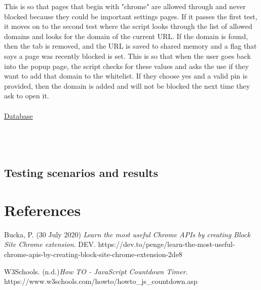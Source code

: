 \documentclass[12pt]{article}
\begin{document}
This is so that pages that begin with "chrome" are allowed through and never blocked because they could be important settings pages. 
If it passes the first test, it moves on to the second test where the script looks through the list of allowed domains and looks for the domain of the current URL. If the domain is found, then the tab is removed, and the URL is saved to shared memory and a flag that says a page was recently blocked is set. 
This is so that when the user goes back into the popup page, the script checks for these values and asks the use if they want to add that domain to the whitelist. If they choose yes and a valid pin is provided, then the domain 
is added and will not be blocked the next time they ask to open it.
\\\\
\underline{Database}\\\\


\\\\
\subsection{Testing scenarios and results}

\section{References}

\begingroup
\renewcommand{\section}[2]{}
\begin{thebibliography}{10}
    Bucka, P. (30 July 2020) \textit{Learn the most useful Chrome APIs by creating Block Site Chrome extension}. 
    DEV. https://dev.to/penge/learn-the-most-useful-chrome-apis-by-creating-block-site-chrome-extension-2de8
    
    W3Schools. (n.d.)\textit{How TO - JavaScript Countdown Timer}. https://www.w3schools.com/howto/howto_js_countdown.asp
    
    \bigskip
\end{thebibliography}
\endgroup
\end{document}
